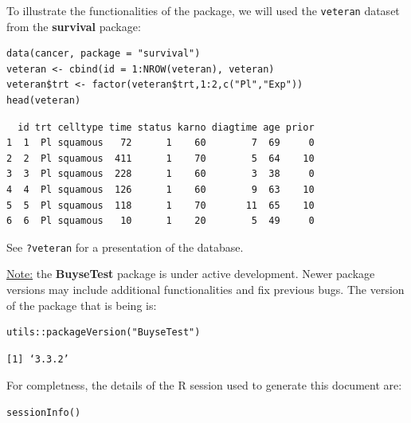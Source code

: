 \documentclass[12pt]{article}
\begin{document}
To illustrate the functionalities of the package, we will used the
\texttt{veteran} dataset from the \textbf{survival} package:
\lstset{language=r,label= ,caption= ,captionpos=b,numbers=none}
\begin{lstlisting}
data(cancer, package = "survival")
veteran <- cbind(id = 1:NROW(veteran), veteran)
veteran$trt <- factor(veteran$trt,1:2,c("Pl","Exp"))
head(veteran)
\end{lstlisting}

\begin{verbatim}
  id trt celltype time status karno diagtime age prior
1  1  Pl squamous   72      1    60        7  69     0
2  2  Pl squamous  411      1    70        5  64    10
3  3  Pl squamous  228      1    60        3  38     0
4  4  Pl squamous  126      1    60        9  63    10
5  5  Pl squamous  118      1    70       11  65    10
6  6  Pl squamous   10      1    20        5  49     0
\end{verbatim}


See \texttt{?veteran} for a presentation of the database.

\bigskip

\uline{Note:} the \textbf{BuyseTest} package is under active development. Newer
package versions may include additional functionalities and fix
previous bugs. The version of the package that is being is:
\lstset{language=r,label= ,caption= ,captionpos=b,numbers=none}
\begin{lstlisting}
utils::packageVersion("BuyseTest")
\end{lstlisting}

\begin{verbatim}
[1] ‘3.3.2’
\end{verbatim}


For completness, the details of the R session used to generate this
document are:
\lstset{language=r,label= ,caption= ,captionpos=b,numbers=none}
\begin{lstlisting}
sessionInfo()
\end{lstlisting}
\end{document}

